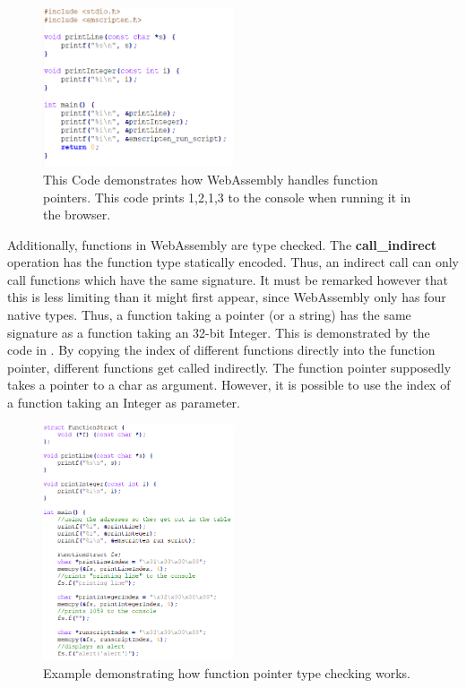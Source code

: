 \documentclass[sigconf]{acmart}
\begin{document}
\begin{figure}[h]
  \centering
  \includegraphics[width=0.5\textwidth]{function_addr_example}
  \caption{This Code demonstrates how WebAssembly handles function pointers. This code prints 1,2,1,3 to the console when running it in the browser.}  
\label{fig:wasm_function_addr}
\end{figure}

Additionally, functions in WebAssembly are type checked. The \textbf{call\_indirect} operation has the function type statically encoded. Thus, an indirect call can only call functions which have the same signature. It must be remarked however that this is less limiting than it might first appear, since WebAssembly only has four native types. Thus, a function taking a pointer (or a string) has the same signature as a function taking an 32-bit Integer. This is demonstrated by the code in . By copying the index of different functions directly into the function pointer, different functions get called indirectly. The function pointer supposedly takes a pointer to a char as argument. However, it is possible to use the index of a function taking an Integer as parameter. 

\begin{figure}[h]
  \centering
  \includegraphics[width=0.5\textwidth]{function_type_check_example}
  \caption{Example demonstrating how function pointer type checking works.}  
\label{fig:wasm_function_type_checking}
\end{figure}
\end{document}
